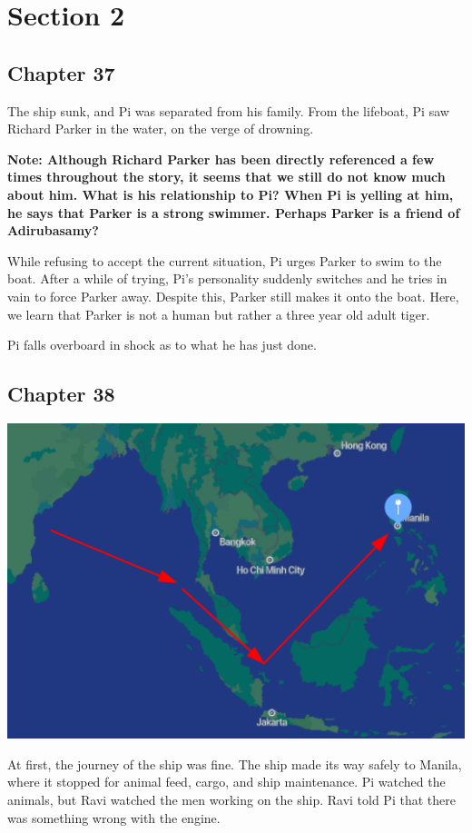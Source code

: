 \documentclass[11pt]{article}
\begin{document}
\section{Section 2}
\label{sec:orgf0cbc13}
\subsection{Chapter 37}
\label{sec:org0db48b6}
The ship sunk, and Pi was separated from his family. From the lifeboat, Pi saw Richard Parker in the water, on the verge of drowning.

\textbf{Note: Although Richard Parker has been directly referenced a few times throughout the story, it seems that we still do not know much about him. What is his relationship to Pi? When Pi is yelling at him, he says that Parker is a strong swimmer. Perhaps Parker is a friend of Adirubasamy?}

While refusing to accept the current situation, Pi urges Parker to swim to the boat. After a while of trying, Pi's personality suddenly switches and he tries in vain to force Parker away. Despite this, Parker still makes it onto the boat. Here, we learn that Parker is not a human but rather a three year old adult tiger.

Pi falls overboard in shock as to what he has just done.
\subsection{Chapter 38}
\label{sec:org48b1437}
\begin{center}
\includegraphics[width=.9\linewidth]{./img/route_to_manila.png}
\end{center}
At first, the journey of the ship was fine. The ship made its way safely to Manila, where it stopped for animal feed, cargo, and ship maintenance. Pi watched the animals, but Ravi watched the men working on the ship. Ravi told Pi that there was something wrong with the engine.
\end{document}
